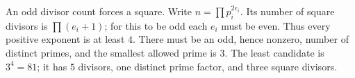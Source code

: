 An odd divisor count forces a square. Write $n=\prod p_i^{2e_i}$. Its number of square divisors is $\prod(e_i+1)$; for this to be odd each $e_i$ must be even. Thus every positive exponent is at least $4$. There must be an odd, hence nonzero, number of distinct primes, and the smallest allowed prime is $3$. The least candidate is $3^4=\boxed{81}$; it has $5$ divisors, one distinct prime factor, and three square divisors.

